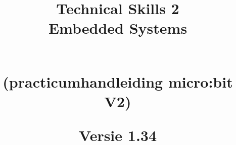 \documentclass[12pt,openright,twoside]{report}
\date{}
\title{

{\vspace{-4cm}}
	{\hspace{-20pt}\begin{bfseries}\Huge{\color{black}Technical Skills 2 \\Embedded Systems} \end{bfseries}  } \\
	{(practicumhandleiding micro:bit V2)}
\ThisCenterWallPaper{0.8}{figuren/bbcmicrobitV2.png}

	{\vspace{18cm}}	
	{\color{white}  
	\raggedleft  \par}
	Versie 1.34

}
\begin{document}
\maketitle

 \tableofcontents

\let\cleardoublepage\clearpage


%

%




%
%
%






\end{document}
